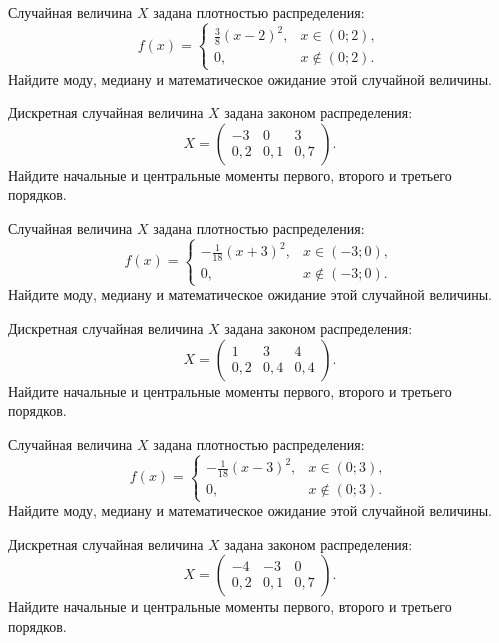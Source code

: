 \vfill

\newpage\setcounter{zad}{0}

\z Случайная величина $X$ задана плотностью распределения: $$f(x) = \begin{cases} \frac{3}{8}(x-2)^2, & x \in (0; 2), \\ 0, & x \not\in (0; 2). \end{cases}$$ Найдите моду, медиану и математическое ожидание этой случайной величины.


\vfill

\z Дискретная случайная величина $X$ задана законом распределения: $$ X = \left(\begin{array}{rrr}-3 & 0 & 3\\0{,}2 & 0{,}1 & 0{,}7\end{array}\right).$$ Найдите начальные и центральные моменты первого, второго и третьего порядков.
 

\vfill

\newpage\setcounter{zad}{0}

\z Случайная величина $X$ задана плотностью распределения: $$f(x) = \begin{cases} -\frac{1}{18}(x+3)^2, & x \in (-3; 0), \\ 0, & x \not\in (-3; 0). \end{cases}$$ Найдите моду, медиану и математическое ожидание этой случайной величины.


\vfill

\z Дискретная случайная величина $X$ задана законом распределения: $$ X = \left(\begin{array}{rrr}1 & 3 & 4\\0{,}2 & 0{,}4 & 0{,}4\end{array}\right).$$ Найдите начальные и центральные моменты первого, второго и третьего порядков.
 

\vfill

\newpage\setcounter{zad}{0}

\z Случайная величина $X$ задана плотностью распределения: $$f(x) = \begin{cases} -\frac{1}{18}(x-3)^2, & x \in (0; 3), \\ 0, & x \not\in (0; 3). \end{cases}$$ Найдите моду, медиану и математическое ожидание этой случайной величины.


\vfill

\z Дискретная случайная величина $X$ задана законом распределения: $$ X = \left(\begin{array}{rrr}-4 & -3 & 0\\0{,}2 & 0{,}1 & 0{,}7\end{array}\right).$$ Найдите начальные и центральные моменты первого, второго и третьего порядков.
 

